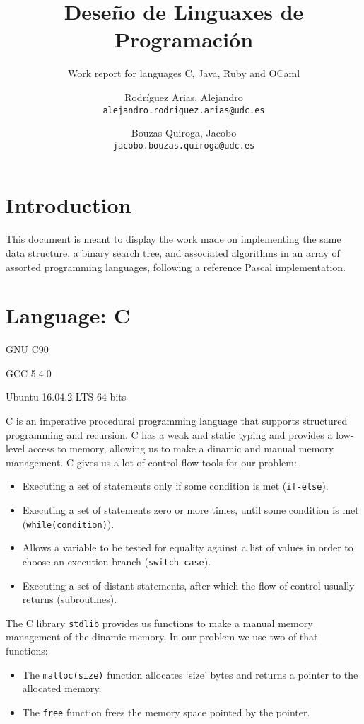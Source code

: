 \documentclass[11pt]{scrartcl} %
\title{Deseño de Linguaxes de Programación}
\subtitle{Work report for languages C, Java, Ruby and OCaml}
\author{Rodríguez Arias, Alejandro\\
	\texttt{alejandro.rodriguez.arias@udc.es}
	\and Bouzas Quiroga, Jacobo\\
	\texttt{jacobo.bouzas.quiroga@udc.es}}
\date{\displaydate{release}}
\begin{document}
\maketitle
\clearpage
\tableofcontents
\clearpage

\section{Introduction}

This document is meant to display the work made on implementing the same data structure, a binary search tree, and associated algorithms in an array of assorted programming languages, following a reference Pascal implementation.

\section{Language: C}

\begin{description}[align=left,labelwidth=10em]
\item [Language Version] GNU C90
\item [Compiler] GCC 5.4.0
\item [Operating System] Ubuntu 16.04.2 LTS 64 bits
\end{description}

C is an imperative procedural programming language that supports structured programming and recursion. C has a weak and static typing and provides a low-level access to memory, allowing us to make a dinamic and manual memory management. C gives us a lot of control flow tools for our problem:

\begin{itemize}  
\item Executing a set of statements only if some condition is met (\texttt{if-else}).
\item Executing a set of statements zero or more times, until some condition is met (\texttt{while(condition)}). 
\item Allows a variable to be tested for equality against a list of values in order to choose an execution branch (\texttt{switch-case}).
\item Executing a set of distant statements, after which the flow of control usually returns (subroutines).
\end{itemize}

The C library \texttt{stdlib} provides us  functions to make a manual memory management of the dinamic memory. In our problem we use two of that functions:
\begin{itemize}
\item The \texttt{malloc(size)} function allocates `size' bytes and returns a pointer to the allocated memory.
\item The \texttt{free} function frees the memory space pointed by the pointer.
\end{itemize}
	
\end{document}
